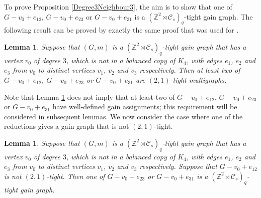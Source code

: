 \documentclass[reqno,a4paper,10pt]{article}
\newtheorem{lemma}[theorem]{Lemma}
\theoremstyle{definition}
\theoremstyle{remark}
\numberwithin{equation}{section}
\numberwithin{figure}{section}
\numberwithin{table}{section}
\newcommand{\Z}{\mathbb{Z}}
\begin{document}
    To prove Proposition \ref{Degree3Neighbour3}, the aim is to show that one of $G-v_0+e_{12}$, $G-v_0+e_{23}$ or $G-v_0+e_{31}$ is a $(\Z^2\rtimes\mathcal{C}_s)_q$-tight gain graph. The following result can be proved by exactly the same proof that was used for \cite[Lemma 5.21]{EssonCrystallographic}.
    \begin{lemma}\label{Condition1Once}
		Suppose that $(G,m)$ is a $(\Z^2\rtimes\mathcal{C}_s)_q$-tight gain graph that has a vertex $v_0$ of degree $3$, which is not in a balanced copy of $K_4$, with edges $e_1$, $e_2$ and $e_3$ from $v_0$ to distinct vertices $v_1$, $v_2$ and $v_3$ respectively. Then at least two of $G-v_0+e_{12}$, $G-v_0+e_{23}$ or $G-v_0+e_{31}$ are $(2,1)$-tight multigraphs.
	\end{lemma}
    Note that Lemma \ref{Condition1Once} does not imply that at least two of $G-v_0+e_{12}$, $G-v_0+e_{23}$ or $G-v_0+e_{31}$ have well-defined gain assignments; this requirement will be considered in subsequent lemmas. We now consider the case where one of the reductions gives a gain graph that is not $(2,1)$-tight.
    \begin{lemma}\label{Fail1Pass2}
		Suppose that $(G,m)$ is a $(\Z^2\rtimes\mathcal{C}_s)_q$-tight gain graph that has a vertex $v_0$ of degree $3$, which is not in a balanced copy of $K_4$, with edges $e_1$, $e_2$ and $e_3$ from $v_0$ to distinct vertices $v_1$, $v_2$ and $v_3$ respectively. Suppose that $G-v_0+e_{12}$ is not $(2,1)$-tight. Then one of $G-v_0+e_{23}$ or $G-v_0+e_{31}$ is a $(\Z^2\rtimes\mathcal{C}_s)_q$-tight gain graph.
	\end{lemma}
\end{document}
